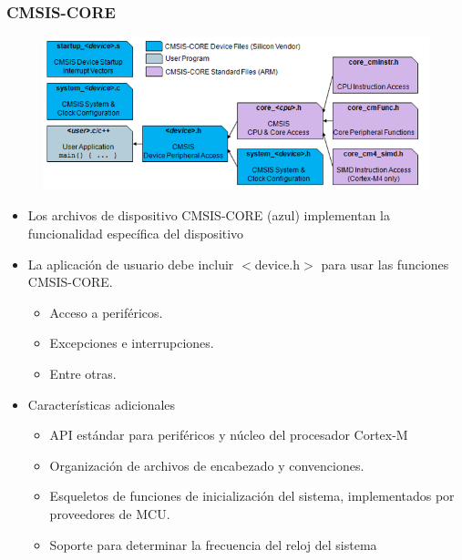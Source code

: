 \documentclass[10.5pt,scale=1.0,t,aspectratio=169,hyperref={pdfpagelabels=false}]{beamer}
\begin{document}
\begin{frame}
	\frametitle{CMSIS-CORE}
	\begin{figure}
		\centering
		\includegraphics[scale=0.5]{CMSISCore}
	\end{figure}
	\begin{multicols}{2}
		\begin{itemize}
			\item Los archivos de dispositivo CMSIS-CORE (azul) implementan la funcionalidad específica del dispositivo
			\item La aplicación de usuario debe incluir $<$device.h$>$ para usar las funciones CMSIS-CORE. 
			\begin{itemize}
				\item Acceso a periféricos.
				\item Excepciones e interrupciones.
				\item Entre otras. 
			\end{itemize}
			\newpage
			\item Características adicionales
			\begin{itemize}
				\item API estándar para periféricos y núcleo del procesador Cortex-M
				\item Organización de archivos de encabezado y convenciones.
				\item Esqueletos de funciones de inicialización del sistema, implementados por proveedores de MCU.
				\item Soporte para determinar la frecuencia del reloj del sistema
			\end{itemize}
		\end{itemize}
	\end{multicols}
\end{frame}
\end{document}
